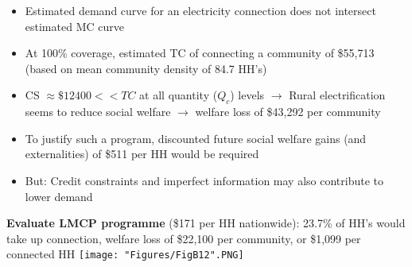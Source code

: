 \documentclass[compress]{beamer}
\begin{document}
\begin{frame}
\begin{itemize}
\item Estimated demand curve for an electricity connection
does not intersect estimated MC curve
\item At 100\% coverage, estimated TC of connecting a community of \$55,713 (based on mean community density of 84.7 HH's)
\item CS $\approx \$ 12400 << TC $ at all quantity ($Q_c$) levels $\to$ Rural electrification seems to reduce social welfare $\to$ welfare loss of \$43,292 per community
\item To justify such a program, discounted future social welfare gains (and externalities) of \$511 per HH would be required
\item But: Credit constraints and imperfect information may also contribute to lower demand
\end{itemize}
\end{frame}

\begin{frame} \centering
 \textbf{Evaluate LMCP programme} (\$171 per HH nationwide): 23.7\% of HH's would take up connection, welfare loss of \$22,100 per community, or \$1,099 per connected HH
\texttt{[image: "Figures/FigB12".PNG]} 
\end{frame}
\end{document}
